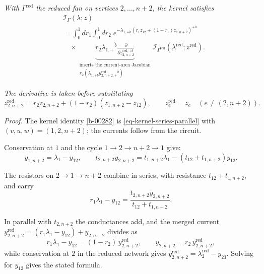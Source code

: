 \documentclass[11pt]{article}
\numberwithin{equation}{section}
\numberwithin{figure}{section}
\numberwithin{table}{section}
\begin{document}
\emph{With $\Gamma^{\mathrm{red}}$ the reduced fan on vertices $2,\ldots,n+2$, the kernel satisfies}
\begin{equation}\label{b-00282}
\begin{aligned}
&\mathcal I_\Gamma(\lambda;z)\\
&={}\int_0^1\!dr_1\int_0^1\!dr_2\;
e^{-\lambda_{1,+\dot a}(r_1z_{12}+(1-r_1)z_{1,n+2})^{+\dot a}}\\
&\quad\times
\underbrace{r_2\lambda_{1,+}{}^{\dot b}
\frac{\partial}{\partial z_{2,n+2}^{\mathrm{red},+\dot b}}}_{
\substack{\text{inserts the current-area Jacobian}\\
r_2(\lambda_{1,+\dot b}y^{\mathrm{red}}_{2,n+2,+}{}^{\dot b})}}
\mathcal I_{\Gamma^{\mathrm{red}}}
(\lambda^{\mathrm{red}};z^{\mathrm{red}})
.
\end{aligned}
\end{equation}

\emph{The derivative is taken before substituting}
\begin{equation*}
z^{\mathrm{red}}_{2,n+2}
=r_2z_{2,n+2}+(1-r_2)(z_{1,n+2}-z_{12}),\qquad
z^{\mathrm{red}}_e=z_e\quad(e\ne(2,n+2)).
\end{equation*}

\emph{Proof.} The kernel identity \eqref{b-00282} is \eqref{eq-kernel-series-parallel} with $(v,u,w)=(1,2,n+2)$; the currents follow from the circuit.

Conservation at $1$ and the cycle $1\to2\to n+2\to1$ give:
\begin{equation*}
y_{1,n+2}=\lambda_1-y_{12},\qquad
t_{2,n+2}y_{2,n+2}=t_{1,n+2}\lambda_1-(t_{12}+t_{1,n+2})y_{12}.
\end{equation*}

The resistors on $2\to1\to n+2$ combine in series, with resistance $t_{12}+t_{1,n+2}$, and carry
\begin{equation*}
r_1\lambda_1-y_{12}=\frac{t_{2,n+2}y_{2,n+2}}{t_{12}+t_{1,n+2}} .
\end{equation*}

In parallel with $t_{2,n+2}$ the conductances add, and the merged current $y^{\mathrm{red}}_{2,n+2}=(r_1\lambda_1-y_{12})+y_{2,n+2}$ divides as
\begin{equation*}
r_1\lambda_1-y_{12}=(1-r_2)\,y^{\mathrm{red}}_{2,n+2},\qquad
y_{2,n+2}=r_2\,y^{\mathrm{red}}_{2,n+2},
\end{equation*}
while conservation at $2$ in the reduced network gives $y^{\mathrm{red}}_{2,n+2}=\lambda^{\mathrm{red}}_2-y_{23}$. Solving for $y_{12}$ gives the stated formula.~\hfill\qedsymbol
\end{document}
